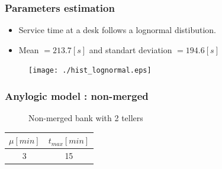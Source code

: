 \documentclass[10pt]{beamer}
\begin{document}
\begin{frame}
  \frametitle{Parameters estimation }
 
 \begin{itemize} 
  \item Service time at a desk 
  follows a lognormal distibution.
  \item Mean $=213.7[s]$ and standart deviation $=194.6[s]$ 
 \end{itemize} 
\begin{figure}[!h]
  \centering
  \texttt{[image: ./hist\_lognormal.eps]}
  \end{figure}  
  
  
  
\end{frame}


\begin{frame}
  \frametitle{Anylogic model : non-merged}
  \begin{figure}
  \centering
{}

\caption{Non-merged bank with 2 tellers}
  \end{figure}
  
\begin{table}
\centering
\begin{tabular}{|c|c|}
\hline
$\mu [min]$ & $t_{max} [min]$ \\
\hline
3 & 15 \\
\hline
\end{tabular} 
\end{table}

\end{frame}
\end{document}
